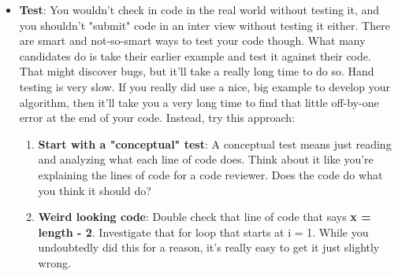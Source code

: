 \documentclass{report}
\begin{document}
\begin{itemize}
\begin{itemize}
                    \bigbreak \noindent 
                    \begin{cppcode}
                        int i = startOfChild ( array)
                    \end{cppcode}
                    \bigbreak \noindent 
                    there might be a better name for this variable, such as startChild.
                    \bigbreak \noindent 
                    Long variable names can also be slow to write though. A good compromise that most interviewers will be okay with is to abbreviate it after the first usage. You can use \textbf{startChild} the first time, and then explain to your interviewer that you will abbreviate this as \textbf{sc} after this.
            \end{itemize}
            The specifics of what makes good code vary between interviewers and candidates, and the problem itself. Focus on writing beautiful code, whatever that means to you.
            \bigbreak \noindent 
            If you see something you can refactor later on, then explain this to your interviewer and decide whether or not it's worth the time to do so. Usually it is, but not always.
            \bigbreak \noindent 
            If you get confused (which is common), go back to your example and walk through it again.
        \item \textbf{Test}: You wouldn't check in code in the real world without testing it, and you shouldn't "submit" code in an inter view without testing it either.
            \bigbreak \noindent 
            There are smart and not-so-smart ways to test your code though.
            \bigbreak \noindent 
            What many candidates do is take their earlier example and test it against their code. That might discover bugs, but it'll take a really long time to do so. Hand testing is very slow. If you really did use a nice, big example to develop your algorithm, then it'll take you a very long time to find that little off-by-one error at the end of your code.
            \bigbreak \noindent 
            Instead, try this approach:
            \begin{enumerate}
                \item \textbf{Start with a "conceptual" test}: A conceptual test means just reading and analyzing what each line of code does. Think about it like you're explaining the lines of code for a code reviewer. Does the code do what you think it should do?
                \item \textbf{Weird looking code}: Double check that line of code that says \textbf{x = length - 2}. Investigate that for loop that starts at i = 1. While you undoubtedly did this for a reason, it's really easy to get it just slightly wrong.

\end{enumerate}
\end{itemize}
\end{document}
